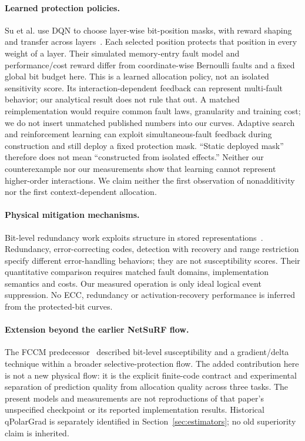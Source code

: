 \paragraph{Learned protection policies.}
Su et al. use DQN to choose layer-wise bit-position masks, with reward shaping
and transfer across layers~\cite{su2025rl}. Each selected position protects that
position in every weight of a layer. Their simulated memory-entry fault model
and performance/cost reward differ from coordinate-wise Bernoulli faults and a
fixed global bit budget here. This is a learned allocation policy, not an
isolated sensitivity score. Its interaction-dependent feedback can represent
multi-fault behavior; our analytical result does not rule that out. A matched
reimplementation would require common fault laws, granularity and training cost;
we do not insert unmatched published numbers into our curves.
Adaptive search and reinforcement learning can exploit simultaneous-fault
feedback during construction and still deploy a fixed protection mask.
``Static deployed mask'' therefore does not mean ``constructed from isolated
effects.'' Neither our counterexample nor our measurements show that learning
cannot represent higher-order interactions. We claim neither the first
observation of nonadditivity nor the first context-dependent allocation.

\paragraph{Physical mitigation mechanisms.}
Bit-level redundancy work exploits structure in stored representations~\cite{catalan2025redundancy}.
Redundancy, error-correcting codes, detection with recovery and range restriction
specify different error-handling behaviors; they are not susceptibility scores.
Their quantitative comparison requires matched fault domains, implementation
semantics and costs. Our measured operation is only ideal logical event
suppression. No ECC, redundancy or activation-recovery performance is inferred
from the protected-bit curves.

\paragraph{Extension beyond the earlier NetSuRF flow.}
The FCCM predecessor~\cite{guo2025inpixel} described bit-level susceptibility and a gradient/delta technique within a broader selective-protection flow. The added contribution here is not a new physical flow: it is the explicit finite-code contract and experimental separation of prediction quality from allocation quality across three tasks. The present models and measurements are not reproductions of that paper's unspecified checkpoint or its reported implementation results. Historical qPolarGrad is separately identified in Section~\ref{sec:estimators}; no old superiority claim is inherited.

